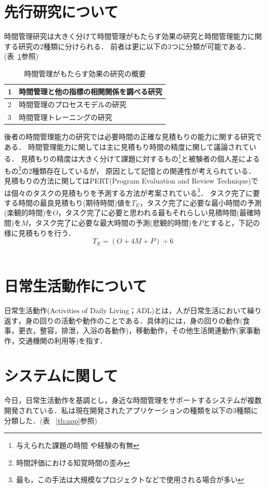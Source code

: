\section{先行研究について}
時間管理研究は大きく分けて時間管理がもたらす効果の研究と時間管理能力に関する研究の2種類に分けられる．
前者は更に以下の3つに分類が可能である．(表~\ref{tb:senko}参照)
\begin{table}[htb]
\begin{center}
  \begin{tabular}{|l|l|} \hline
   1 & 時間管理と他の指標の相関関係を調べる研究 \\ \hline
   2 & 時間管理のプロセスモデルの研究 \\ \hline
   3 & 時間管理トレーニングの研究 \\ \hline
  \end{tabular}
  \caption{時間管理がもたらす効果の研究の概要}
  \label{tb:senko}
\end{center}
\end{table}

後者の時間管理能力の研究では必要時間の正確な見積もりの能力に関する研究である．
時間管理能力に関しては主に見積もり時間の精度に関して議論されている．
見積もりの精度は大きく分けて課題に対するもの\footnote{与えられた課題の時間 \cite{Roy2008}や経験の有無\cite{Roy2007}}と被験者の個人差によるもの\footnote{時間評価における知覚時間の歪み\cite{Oguro1961}\cite{Murakami2016}}の2種類存在しているが，
原因として記憶との関連性が考えられている\cite{Roy2005}．
見積もりの方法に関してはPERT(Program Evaluation and Review Technique)では個々のタスクの見積もりを予測する方法が考案されている\footnote{最も，この手法は大規模なプロジェクトなどで使用される場合が多い}．
タスク完了に要する時間の最良見積もり(期待時間)値を$T_{E}$，タスク完了に必要な最小時間の予測(楽観的時間)を$O$，タスク完了に必要と思われる最もそれらしい見積時間(最確時間)を$M$，タスク完了に必要な最大時間の予測(悲観的時間)を$P$とすると，下記の様に見積もりを行う．
\[ 
T_{E} = (O + 4M + P) ÷ 6
\]　

\section{日常生活動作について}
日常生活動作(Activities of Daily Living；ADL)とは，人が日常生活において繰り返す，身の回りの活動や動作のことである．具体的には，身の回りの動作(食事，更衣，整容，排泄，入浴の各動作)，移動動作，その他生活関連動作(家事動作，交通機関の利用等)を指す\cite{Sakai2003}．

\section{システムに関して}
今日，日常生活動作を基調とし，身近な時間管理をサポートするシステムが複数開発されている．私は現在開発されたアプリケーションの種類を以下の3種類に分類した．(表 ~\ref{tb:app}参照)

